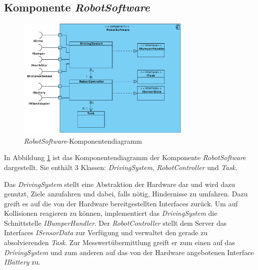 \subsection{Komponente \textit{RobotSoftware}}
\begin{figure}[H]
\centering
\includegraphics[width=0.75\textwidth]{img/1-Entwurf-5-RobotSoftware}
\caption{\emph{RobotSoftware}-Komponentendiagramm}
\label{KomponentenStruktur2}
\end{figure}
In Abbildung \ref{KomponentenStruktur2} ist das Komponentendiagramm der Komponente \textit{RobotSoftware} dargestellt. Sie enthält 3 Klassen: \textit{DrivingSystem}, \textit{RobotController} und \textit{Task}.


Das \textit{DrivingSystem} stellt eine Abstraktion der Hardware dar und wird dazu genutzt, Ziele anzufahren und dabei,
falls nötig, Hindernisse zu umfahren. Dazu greift es auf die von der Hardware bereitgestellten Interfaces zurück.
Um auf Kollisionen reagieren zu können, implementiert das \textit{DrivingSystem} die Schnittstelle \textit{IBumperHandler}.
Der \textit{RobotController} stellt dem Server das Interfaces \textit{ISensorData} zur Verfügung und verwaltet den gerade
zu absolvierenden \emph{Task}. Zur Messwertübermittlung greift er zum einen auf das \textit{DrivingSystem} und zum anderen auf das
von der Hardware angebotenen Interface \textit{IBattery} zu.
